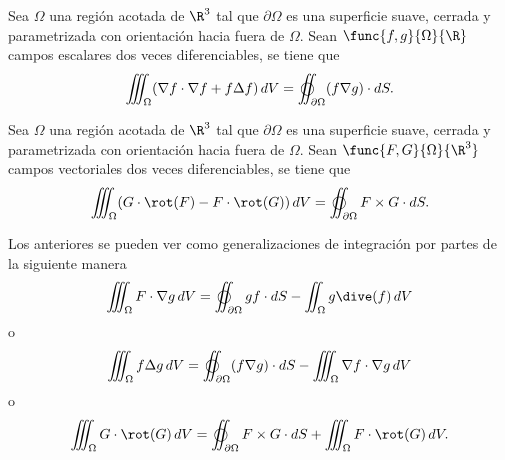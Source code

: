 \documentclass[a4,11pt]{aleph-notas}
\begin{document}
\begin{prop}
    Sea $\Omega$ una región acotada de $\R^3$ tal que $\partial \Omega$ es una superficie suave, cerrada y parametrizada con orientación hacia fuera de $\Omega$. Sean $\func{f,g}{\Omega}{\R}$ campos escalares dos veces diferenciables, se tiene que
    \[
        \iiint_\Omega (\nabla f\cdot \nabla f + f \Delta f) \, dV 
        =
        \varoiint_{\partial \Omega} (f\nabla g) \cdot dS.
    \]
\end{prop}

\begin{prop}
    Sea $\Omega$ una región acotada de $\R^3$ tal que $\partial \Omega$ es una superficie suave, cerrada y parametrizada con orientación hacia fuera de $\Omega$. Sean $\func{F,G}{\Omega}{\R^3}$ campos vectoriales dos veces diferenciables, se tiene que
    \[
        \iiint_{\Omega} (G \cdot \rot(F) - F \cdot \rot(G))\, dV
        = \varoiint_{\partial \Omega}  F\times G \cdot dS.
    \]
\end{prop}

\begin{advertencia}
    Los anteriores se pueden ver como generalizaciones de integración por partes de la siguiente manera
    \[
        \iiint_{\Omega} F \cdot \nabla g \, dV 
        = \varoiint_{\partial \Omega}  g f \cdot dS - \iint_\Omega g \dive(f)\, dV
    \]
    o
    \[
        \iiint_\Omega f \Delta g \, dV 
        =
        \varoiint_{\partial \Omega} (f\nabla g) \cdot dS
        -\iiint_\Omega \nabla f\cdot \nabla g \, dV
    \]
    o
    \[
        \iiint_{\Omega} G \cdot \rot(G) \, dV
        = \varoiint_{\partial \Omega}  F\times G \cdot dS
        +\iiint_\Omega  F \cdot \rot(G) \,dV.
    \]
\end{advertencia}
\end{document}
